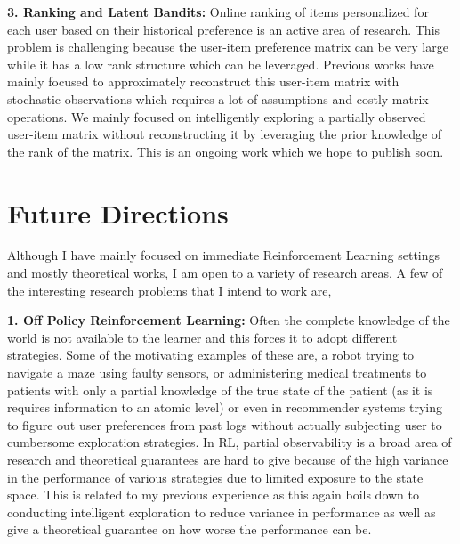 \documentclass[twoside]{article}
\begin{document}

\textbf{3. Ranking and Latent Bandits:} Online ranking of items personalized for each user based on their historical preference is an active area of research. This problem is challenging because the user-item preference matrix can be very large while it has a low rank structure which can be leveraged. Previous works have mainly focused to approximately reconstruct this user-item matrix with stochastic observations which requires a lot of assumptions and costly matrix operations. We mainly focused on intelligently exploring a partially observed user-item matrix without reconstructing it by leveraging the prior knowledge of the rank of the matrix. This is an ongoing \href{https://subhojyoti.github.io/pdf/paper.pdf}{work} which we hope to publish soon.
	 
	
\vspace*{-2em}
\section{Future Directions}
\vspace*{-1em}

Although I have mainly focused on immediate Reinforcement Learning settings and mostly theoretical works, I am open to a variety of research areas. A few of the interesting research problems that I intend to work are,

\textbf{1. Off Policy Reinforcement Learning:} Often the complete knowledge of the world is not available to the learner and this forces it to adopt different strategies. Some of the motivating examples of these are, a robot trying to navigate a maze using faulty sensors, or administering medical treatments to patients with only a partial knowledge of the true state of the patient (as it is requires information to an atomic level) or even in recommender systems trying to figure out user preferences from past logs without actually subjecting user to cumbersome exploration strategies. In RL,  partial observability is a broad area of research and theoretical guarantees are hard to give because of the high variance in the performance of various strategies due to limited exposure to the state space. This is related to my previous experience as this again boils down to conducting intelligent exploration to reduce variance in  performance as well as give a theoretical guarantee on how worse the performance can be.
\end{document}
